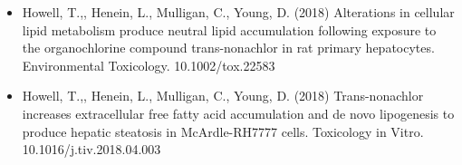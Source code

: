 \documentclass[10pt,a4paper]{altacv}
\begin{document}
\begin{itemize}
\item Howell, T.,\textbf{\color{accent}{McDevitt, E.}}, Henein, L., Mulligan, C., Young, D. (2018) Alterations in cellular lipid metabolism produce neutral lipid accumulation following exposure to the organochlorine compound trans-nonachlor in rat primary hepatocytes. Environmental Toxicology. 10.1002/tox.22583
\item Howell, T.,\textbf{\color{accent}{McDevitt, E.}}, Henein, L., Mulligan, C., Young, D. (2018) Trans-nonachlor increases extracellular free fatty acid accumulation and de novo lipogenesis to produce hepatic steatosis in McArdle-RH7777 cells. Toxicology in Vitro. 10.1016/j.tiv.2018.04.003 
\end{itemize}

\clearpage
\end{document}

